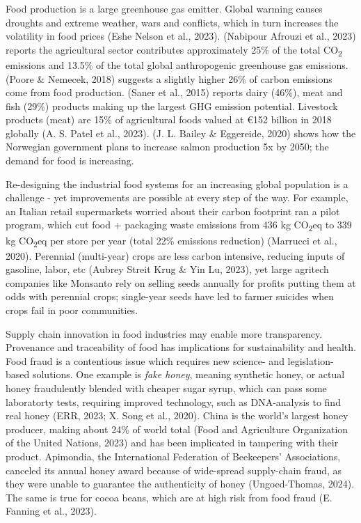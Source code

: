 \documentclass[
  12pt,
  letterpaper,
  DIV=11,
  numbers=noendperiod]{scrartcl}
\begin{document}
Food production is a large greenhouse gas emitter. Global warming causes
droughts and extreme weather, wars and conflicts, which in turn
increases the volatility in food prices (Eshe Nelson et al., 2023).
(Nabipour Afrouzi et al., 2023) reports the agricultural sector
contributes approximately 25\% of the total CO\textsubscript{2}
emissions and 13.5\% of the total global anthropogenic greenhouse gas
emissions. (Poore \& Nemecek, 2018) suggests a slightly higher 26\% of
carbon emissions come from food production. (Saner et al., 2015) reports
dairy (46\%), meat and fish (29\%) products making up the largest GHG
emission potential. Livestock products (meat) are 15\% of agricultural
foods valued at €152 billion in 2018 globally (A. S. Patel et al.,
2023). (J. L. Bailey \& Eggereide, 2020) shows how the Norwegian
government plans to increase salmon production 5x by 2050; the demand
for food is increasing.

Re-designing the industrial food systems for an increasing global
population is a challenge - yet improvements are possible at every step
of the way. For example, an Italian retail supermarkets worried about
their carbon footprint ran a pilot program, which cut food + packaging
waste emissions from 436 kg CO\textsubscript{2}eq to 339 kg
CO\textsubscript{2}eq per store per year (total 22\% emissions
reduction) (Marrucci et al., 2020). Perennial (multi-year) crops are
less carbon intensive, reducing inputs of gasoline, labor, etc (Aubrey
Streit Krug \& Yin Lu, 2023), yet large agritech companies like Monsanto
rely on selling seeds annually for profits putting them at odds with
perennial crops; single-year seeds have led to farmer suicides when
crops fail in poor communities.

Supply chain innovation in food industries may enable more transparency.
Provenance and traceability of food has implications for sustainability
and health. Food fraud is a contentious issue which requires new
science- and legislation-based solutions. One example is \emph{fake
honey}, meaning synthetic honey, or actual honey fraudulently blended
with cheaper sugar syrup, which can pass some laboratorty tests,
requiring improved technology, such as DNA-analysis to find real honey
(ERR, 2023; X. Song et al., 2020). China is the world's largest honey
producer, making about 24\% of world total (Food and Agriculture
Organization of the United Nations, 2023) and has been implicated in
tampering with their product. Apimondia, the International Federation of
Beekeepers' Associations, canceled its annual honey award because of
wide-spread supply-chain fraud, as they were unable to guarantee the
authenticity of honey (Ungoed-Thomas, 2024). The same is true for cocoa
beans, which are at high risk from food fraud (E. Fanning et al., 2023).
\end{document}

